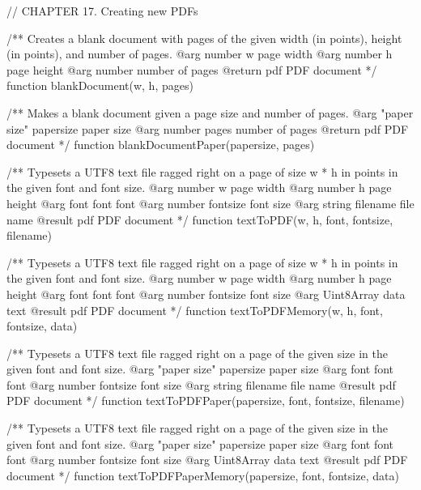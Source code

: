 // CHAPTER 17. Creating new PDFs

/** Creates a blank document with pages of the given width (in points), height
(in points), and number of pages.
@arg {number} w page width
@arg {number} h page height
@arg {number} number of pages
@return {pdf} PDF document */
function blankDocument(w, h, pages) {}

/** Makes a blank document given a page size and number of pages.
@arg {"paper size"} papersize paper size
@arg {number} pages number of pages
@return {pdf} PDF document */
function blankDocumentPaper(papersize, pages) {}

/** Typesets a UTF8 text file ragged right on a page of size w * h in points
in the given font and font size.
@arg {number} w page width
@arg {number} h page height
@arg {font} font font
@arg {number} fontsize font size
@arg {string} filename file name
@result {pdf} PDF document */
function textToPDF(w, h, font, fontsize, filename) {}

/** Typesets a UTF8 text file ragged right on a page of size w * h in points
in the given font and font size.
@arg {number} w page width
@arg {number} h page height
@arg {font} font font
@arg {number} fontsize font size
@arg {Uint8Array} data text
@result {pdf} PDF document */
function textToPDFMemory(w, h, font, fontsize, data) {}

/** Typesets a UTF8 text file ragged right on a page of the given size in the
given font and font size.
@arg {"paper size"} papersize paper size
@arg {font} font font
@arg {number} fontsize font size
@arg {string} filename file name
@result {pdf} PDF document */
function textToPDFPaper(papersize, font, fontsize, filename) {}

/** Typesets a UTF8 text file ragged right on a page of the given size in the
given font and font size.
@arg {"paper size"} papersize paper size
@arg {font} font font
@arg {number} fontsize font size
@arg {Uint8Array} data text
@result {pdf} PDF document */
function textToPDFPaperMemory(papersize, font, fontsize, data) {}

